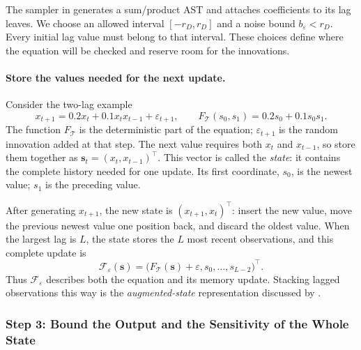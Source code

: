 The sampler in  generates a
sum/product AST and attaches coefficients to its lag leaves. We choose
an allowed interval $[-r_D,r_D]$ and a noise bound $b_\varepsilon<r_D$.
Every initial lag value must belong to that interval. These choices define
where the equation will be checked and reserve room for the innovations.

\paragraph{Store the values needed for the next update.}
Consider the two-lag example
\begin{equation}
 x_{t+1}=0.2x_t+0.1x_tx_{t-1}+\varepsilon_{t+1},
 \qquad F_{\mathcal T}(s_0,s_1)=0.2s_0+0.1s_0s_1.
 \label{eq:jacobian-explanatory-recurrence}
\end{equation}
The function $F_{\mathcal T}$ is the deterministic part of the equation;
$\varepsilon_{t+1}$ is the random innovation added at that step.
The next value requires both $x_t$ and $x_{t-1}$, so store them together as
$\mathbf{s}_t=(x_t,x_{t-1})^\top$. This vector is called the \emph{state}:
it contains the complete history needed for one update. Its first coordinate,
$s_0$, is the newest value; $s_1$ is the preceding value.

After generating $x_{t+1}$, the new state is $(x_{t+1},x_t)^\top$:
insert the new value, move the previous newest value one position back, and
discard the oldest value. When the largest lag is $L$, the state stores the
$L$ most recent observations, and this complete update is
\begin{equation}
 \mathcal F_\varepsilon(\mathbf{s})=
 \bigl(F_{\mathcal T}(\mathbf{s})+\varepsilon,
       s_0,\ldots,s_{L-2}\bigr)^\top.
 \label{eq:implemented-state-transition}
\end{equation}
Thus $\mathcal F_\varepsilon$ describes both the equation and its memory
update. Stacking lagged observations this way is the \emph{augmented-state}
representation discussed by \citet{laraba2016setinvariance}.

\subsubsection{Step 3: Bound the Output and the Sensitivity of the Whole State}
